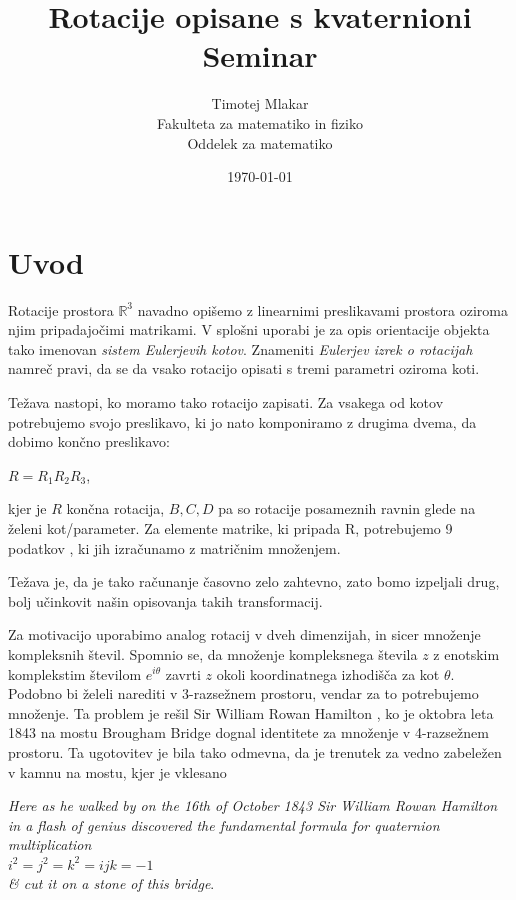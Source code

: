 \documentclass[a4paper,12pt]{article}
\title{Rotacije opisane s kvaternioni \\ 
\Large Seminar}
\author{Timotej Mlakar \\
Fakulteta za matematiko in fiziko \\
Oddelek za matematiko}
\date{\today}
\def\R{\mathbb{R}} %
\begin{document}


\maketitle
\vspace{5em}
\tableofcontents


\newpage
\section{Uvod}

Rotacije prostora $\R^3$ navadno opišemo z linearnimi preslikavami prostora oziroma njim pripadajočimi matrikami.
V splošni uporabi je za opis orientacije objekta tako imenovan \emph{sistem Eulerjevih kotov}. Znameniti \emph{Eulerjev izrek o rotacijah} namreč pravi,
da se da vsako rotacijo opisati s tremi parametri oziroma koti.

Težava nastopi, ko moramo tako rotacijo zapisati. Za vsakega od kotov potrebujemo svojo preslikavo, ki jo
nato komponiramo z drugima dvema, da dobimo končno preslikavo:
\begin{center}
   $R = R_{1}R_{2}R_{3}$,
\end{center}
kjer je $R$ končna rotacija, $B, C, D$ pa so rotacije posameznih ravnin glede na želeni kot/parameter.
Za elemente matrike, ki pripada R, potrebujemo 9  podatkov \cite{salamin1979application}, ki jih izračunamo z matričnim množenjem.

Težava je, da je tako računanje časovno zelo zahtevno, zato bomo izpeljali drug, bolj učinkovit našin opisovanja takih transformacij.

Za motivacijo uporabimo analog rotacij v dveh dimenzijah, in sicer množenje kompleksnih števil.
Spomnio se, da množenje kompleksnega števila $z$ z enotskim komplekstim številom $e^{i\theta}$ zavrti $z$ okoli koordinatnega izhodišča za kot $\theta$.
Podobno bi želeli narediti v 3-razsežnem prostoru, vendar za to potrebujemo množenje.
Ta problem je rešil Sir William Rowan Hamilton \cite{shoemake1985animating}, ko je oktobra leta 1843 na mostu Brougham Bridge dognal identitete za množenje v 4-razsežnem prostoru.
Ta ugotovitev je bila tako odmevna, da je trenutek za vedno zabeležen v kamnu na mostu, kjer je vklesano
\begin{center}
   \emph{ Here as he walked by
   on the 16th of October 1843
   Sir William Rowan Hamilton
   in a flash of genius discovered
   the fundamental formula for
   quaternion multiplication}\\
   $i^2 = j^2 = k^2 = ijk = -1$\\
   \emph{ \& cut it on a stone of this bridge}. ~\cite{baez2004baezstuff}
\end{center}
\end{document}
